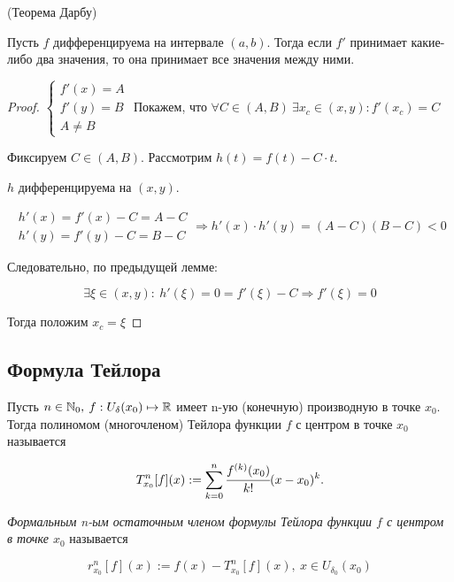 \begin{theorem}
	\hypertarget{thrm6.5}{(Теорема Дарбу)} Пусть $f$ дифференцируема на интервале $(a, b)$. Тогда если $f'$ принимает какие-либо два значения, то она принимает все значения между ними.  
\end{theorem}
\begin{proof}
	$\begin{cases}
		f'(x) = A \\
		f'(y) = B \\
		A \neq B
	\end{cases}$ Покажем, что $\forall C\in \left(A, B\right) \ \exists x_{c} \in (x,y): f'(x_{c}) = C $
	
	Фиксируем $C \in \left(A, B \right)$. Рассмотрим $h(t) = f(t) - C\cdot t$.
	
	$h$ дифференцируема на $(x,y)$. 
	
	$$\begin{gathered}
		h'(x) = f'(x) - C = A - C \\
		h'(y) = f'(y) - C = B-C
	\end{gathered}
	\Rightarrow h'(x)\cdot h'(y) = \left(A-C\right)\left(B-C\right) < 0 $$
	
	Следовательно, по предыдущей лемме:
	
	$$\exists \xi \in (x,y): \ h'(\xi) = 0 = f'(\xi) - C \Rightarrow f'(\xi) = 0$$
	
	Тогда положим $x_{c} = \xi$
\end{proof}

\subsection{Формула Тейлора}

\begin{definition}
	Пусть $n \in \mathbb{N}_{0},$ $f: U_{\delta}(x_{0})\mapsto \mathbb{R}$ имеет n-ую (конечную) производную в точке $x_{0}$. Тогда \hypertarget{def5.13}{полиномом (многочленом) Тейлора функции $f$ с центром в точке $x_{0}$} называется
	
	$$T_{x_{0}}^{n} [f](x) := \sum\limits_{k = 0}^n \cfrac{f^{(k)}(x_{0})}{k!}(x-x_{0})^{k}.$$ 
\end{definition}

\begin{definition}
	\textit{Формальным n-ым остаточным членом формулы Тейлора функции $f$ с центром в точке $x_{0}$} называется 
	
	$$r_{x_{0}}^{n} [f](x):= f(x) -T_{x_{0}}^{n} [f](x),\ x\in U_{\delta_{0}}(x_{0}) $$
\end{definition}

